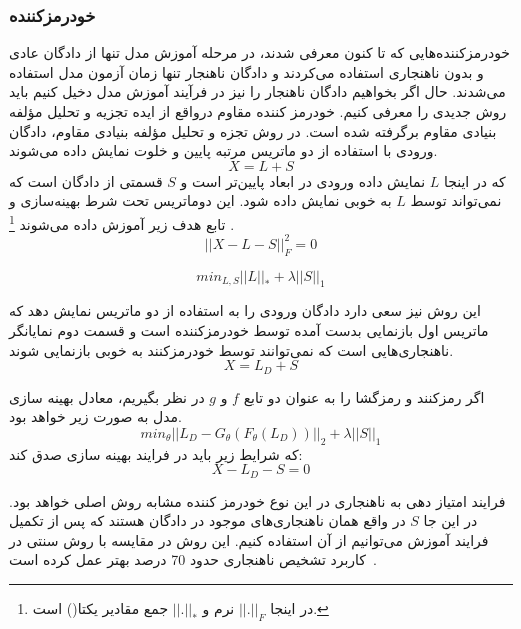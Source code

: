 \documentclass[12pt,a4paper]{report}
\begin{document}
\subsubsection{خودرمزکننده }
خودرمزکننده‌هایی که تا کنون معرفی شدند، در مرحله آموزش مدل تنها از دادگان عادی و بدون ناهنجاری استفاده می‌کردند و دادگان ناهنجار تنها زمان آزمون مدل استفاده می‌شدند. حال اگر بخواهیم دادگان ناهنجار را نیز در فرآیند آموزش مدل دخیل کنیم باید روش جدیدی را معرفی کنیم. خودرمز کننده مقاوم درواقع از ایده تجزیه و تحلیل مؤلفه بنیادی مقاوم برگرفته شده است. در روش تجزه و تحلیل مؤلفه 
بنیادی مقاوم، دادگان ورودی با استفاده از دو ماتریس مرتبه پایین و خلوت نمایش داده می‌شوند.
\begin{equation}
	X = L + S
\end{equation}
که در اینجا $L$ نمایش داده ورودی در ابعاد پایین‌تر است و $S$ قسمتی از دادگان است که نمی‌تواند توسط $L$ به خوبی نمایش داده شود. این دوماتریس تحت شرط بهینه‌سازی و تابع هدف زیر آموزش داده می‌شوند
\footnote{
در اینجا
 $||.||_F$ 
نرم  و 
$||.||_*$
 جمع مقادیر یکتا() است.
}
.
\begin{equation}
	||X-L-S||_F^2 = 0
\end{equation}

\begin{equation}
	min_{L,S} ||L||_* + \lambda||S||_1
\end{equation}

این روش نیز سعی دارد دادگان ورودی را به استفاده از دو ماتریس نمایش دهد که ماتریس اول بازنمایی بدست آمده توسط خودرمزکننده است و قسمت دوم نمایانگر ناهنجاری‌هایی است که نمی‌توانند توسط خودرمزکنند به خوبی بازنمایی شوند.
\begin{equation}
X = L_D + S
\end{equation}

اگر رمزکنند و رمزگشا را به عنوان دو تابع $f$ و $g$ در نظر بگیریم، معادل بهینه سازی مدل به صورت زیر خواهد بود.
\begin{equation}
	min_{\theta} || L_D - G_\theta(F_\theta(L_D)) ||_2 + \lambda ||S||_1
\end{equation}
که شرایط زیر باید در فرایند بهینه سازی صدق کند:
\begin{equation}
X-L_D-S=0
\end{equation}

فرایند امتیاز دهی به ناهنجاری در این نوع خودرمز کننده مشابه روش اصلی خواهد بود. در این جا $S$ در واقع همان ناهنجاری‌های موجود در دادگان هستند که پس از تکمیل فرایند آموزش می‌توانیم از آن استفاده کنیم. این روش در مقایسه با روش سنتی در کاربرد تشخیص ناهنجاری حدود 70 درصد بهتر عمل کرده است~\cite{10.1145/3097983.3098052}.\\
\end{document}
